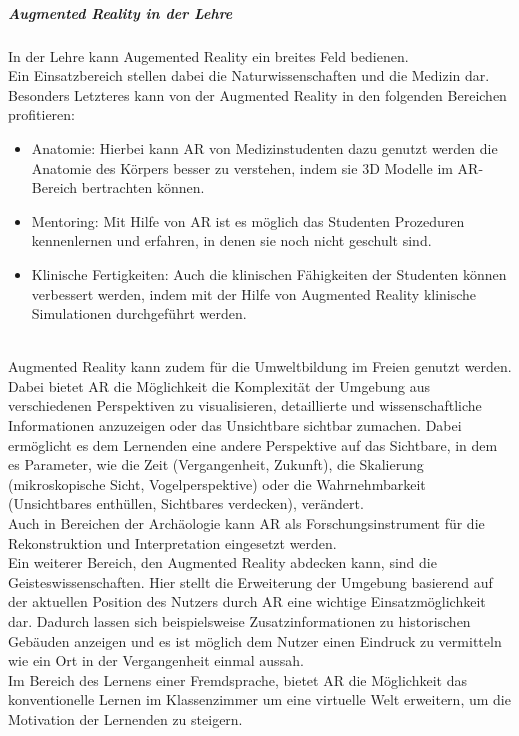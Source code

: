 \subparagraph{Augmented Reality in der Lehre}
In der Lehre kann Augemented Reality ein breites Feld bedienen.\\
Ein Einsatzbereich stellen dabei die Naturwissenschaften und die Medizin dar.
Besonders Letzteres kann von der Augmented Reality in den folgenden Bereichen profitieren:
\begin{itemize}
\item Anatomie: Hierbei kann AR von Medizinstudenten dazu genutzt werden die Anatomie des Körpers besser zu verstehen, indem sie 3D Modelle im AR-Bereich bertrachten können.
\item Mentoring: Mit Hilfe von AR ist es möglich das Studenten Prozeduren kennenlernen und erfahren, in denen sie noch nicht geschult sind. 
\item Klinische Fertigkeiten: Auch die klinischen Fähigkeiten der Studenten können verbessert werden, indem mit der Hilfe von Augmented Reality klinische Simulationen durchgeführt werden.
\end{itemize}
\citep[Kapitel 7-9]{geroimenko:ar-in-education} \\
Augmented Reality kann zudem für die Umweltbildung im Freien genutzt werden. Dabei bietet AR die Möglichkeit die Komplexität der Umgebung aus verschiedenen Perspektiven zu visualisieren, detaillierte und wissenschaftliche Informationen anzuzeigen oder das \glqq Unsichtbare\grqq{} sichtbar zumachen.
Dabei ermöglicht es dem Lernenden eine andere Perspektive auf das Sichtbare, in dem es Parameter, wie die Zeit (Vergangenheit, Zukunft), die Skalierung (mikroskopische Sicht, Vogelperspektive) oder die Wahrnehmbarkeit (Unsichtbares enthüllen, Sichtbares verdecken), verändert. \citep[Kapitel 17]{geroimenko:ar-in-education}\\
Auch in Bereichen der Archäologie kann AR als Forschungsinstrument für die Rekonstruktion und Interpretation eingesetzt werden. \citep[Kapitel 17]{geroimenko:ar-in-education}\\
Ein weiterer Bereich, den Augmented Reality abdecken kann, sind die Geisteswissenschaften.
Hier stellt die Erweiterung der Umgebung basierend auf der aktuellen Position des Nutzers durch AR eine wichtige Einsatzmöglichkeit dar. Dadurch lassen sich beispielsweise Zusatzinformationen zu historischen Gebäuden anzeigen und es ist möglich dem Nutzer einen Eindruck zu vermitteln wie ein Ort in der Vergangenheit einmal aussah. \citep[Kapitel 11-12]{geroimenko:ar-in-education}\\
Im Bereich des Lernens einer Fremdsprache, bietet AR die Möglichkeit das konventionelle Lernen im Klassenzimmer um eine virtuelle Welt erweitern, um die Motivation der Lernenden zu steigern. \citep[Kapitel 11-12]{geroimenko:ar-in-education}

